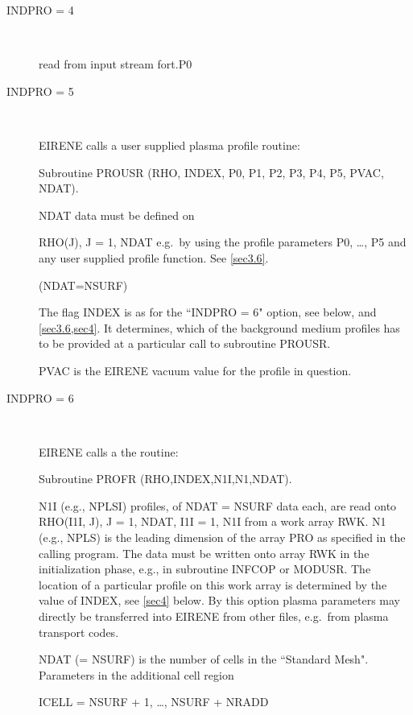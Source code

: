 \begin{description}
\begin{description}
          \item[INDPRO = 4] ~

                read from input stream fort.P0

          \item[INDPRO = 5] ~

                EIRENE calls a user supplied plasma profile routine:

                Subroutine PROUSR (RHO, INDEX, P0, P1, P2, P3, P4, P5, PVAC, NDAT).

                NDAT data must be defined on

                RHO(J), J = 1, NDAT e.g.\ by using the profile parameters P0, \dots, P5 and any
                user supplied profile function.
                See \cref{sec3.6}.

                (NDAT=NSURF)

                The flag INDEX is as for the ``INDPRO = 6" option, see below, and
                \cref{sec3.6,sec4}.
                It determines, which of the background medium profiles has to be provided at a
                particular call to subroutine PROUSR.

                PVAC is the EIRENE vacuum value for the profile in question.
          \item[INDPRO = 6] ~

                EIRENE calls a the routine:

                Subroutine PROFR (RHO,INDEX,N1I,N1,NDAT).

                N1I (e.g., NPLSI) profiles, of NDAT = NSURF data each, are read onto RHO(I1I,
                J), J = 1, NDAT, I1I = 1, N1I from a work array RWK.
                N1 (e.g., NPLS) is the leading dimension of the array PRO as specified in the
                calling program.
                The data must be written onto array RWK in the initialization phase, e.g., in
                subroutine INFCOP or MODUSR.
                The location of a particular profile on this work array is determined by the
                value of INDEX, see \cref{sec4} below.
                By this option plasma parameters may directly be transferred into EIRENE from
                other files, e.g.\ from plasma transport codes.

                NDAT (= NSURF) is the number of cells in the ``Standard Mesh".
                Parameters in the additional cell region

                ICELL = NSURF + 1, \dots, NSURF + NRADD


\end{description}
\end{description}
